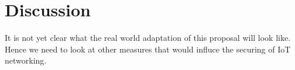 \section{Discussion}
\label{sec:discussion}
It is not yet clear what the real world adaptation of this proposal will look like. Hence we need to look at other measures that would influce the securing of IoT networking.
